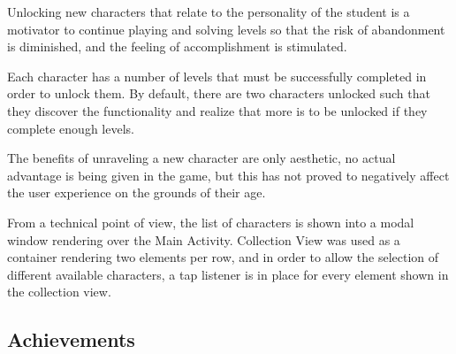 \documentclass[12 pct]{report}
\begin{document}
Unlocking new characters that relate to the personality of the student is a motivator to continue playing and solving levels so that the risk of abandonment is diminished, and the feeling of accomplishment is stimulated.

Each character has a number of levels that must be successfully completed in order to unlock them.  
By default, there are two characters unlocked such that they discover the functionality and realize that more is to be unlocked if they complete enough levels.

The benefits of unraveling a new character are only aesthetic, no actual advantage is being given in the game, but this has not proved to negatively affect the user experience on the grounds of their age.


From a technical point of view, the list of characters is shown into a modal window rendering over the Main Activity. 
Collection View was used as a container rendering two elements per row, and in order to allow the selection of different available characters, a tap listener is in place for every element shown in the collection view.

\subsection*{Achievements}
 
\end{document}
